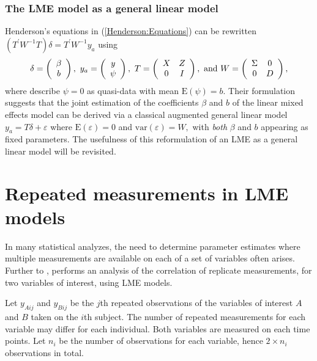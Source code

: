 \documentclass[MAIN.tex]{subfiles}
\begin{document}
	\subsubsection{The LME model as a general linear model}
	Henderson's equations in (\ref{Henderson:Equations}) can be rewritten $( T^\prime W^{-1} T ) \delta = T^\prime W^{-1} y_{a} $ using
	\[
	\delta = \left(\begin{array}{c}\beta \\ b \end{array}\right),
	\ y_{a} = \left(\begin{array}{c}
	y \cr \psi
	\end{array}\right),
	\ T = \left(\begin{array}{cc}
	X & Z  \\
	0 & I
	\end{array}\right),
	\ \textrm{and} \ W = \left(\begin{array}{cc}
	\Sigma & 0  \cr
	0 &  D \end{array}\right),
	\]
	where \cite{Lee:Neld:Pawi:2006} describe $\psi = 0$ as quasi-data with mean $\mathrm{E}(\psi) = b.$ Their formulation suggests that the joint estimation of the coefficients $\beta$ and $b$ of the linear mixed effects model can be derived via a classical augmented general linear model $y_{a} = T\delta + \varepsilon$ where $\mathrm{E}(\varepsilon) = 0$ and $\mathrm{var}(\varepsilon) = W,$ with \emph{both} $\beta$ and $b$ appearing as fixed parameters. The usefulness of this reformulation of an LME as a general linear model will be revisited.
	
	
	\newpage                                                                    %
	\section{Repeated measurements in LME models}
	
	In many statistical analyzes, the need to determine parameter estimates where multiple measurements are available on each of a set of variables often arises. Further to \citet{lam}, \citet{hamlett} performs an analysis of the correlation of replicate measurements, for two variables of interest, using LME models.
	
	Let $y_{Aij}$ and $y_{Bij}$ be the $j$th repeated observations of the variables of interest $A$ and $B$ taken on the $i$th subject. The number of repeated measurements for each variable may differ for each individual.
	Both variables are measured on each time points. Let $n_{i}$ be the number of observations for each variable, hence $2\times n_{i}$ observations in total.
	
\end{document}
